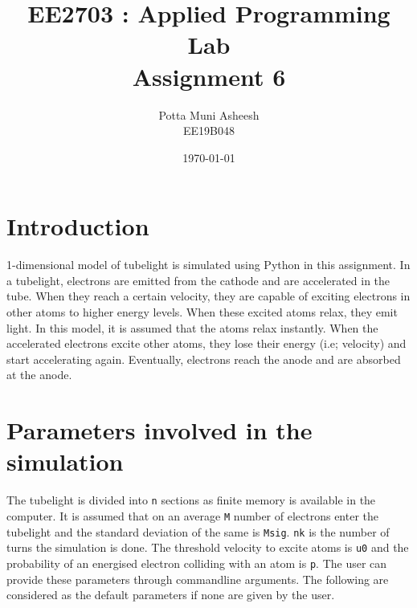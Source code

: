 \documentclass[12pt, a4paper]{article}
\title{\textbf{EE2703 : Applied Programming Lab \\ Assignment 6}} %
\author{Potta Muni Asheesh \\ EE19B048} %
\date{\today} %
\begin{document}
	
		
\maketitle %

\section{Introduction}

1-dimensional model of tubelight is simulated using Python in this assignment. In a tubelight, electrons are emitted from the cathode and are accelerated in the tube. When they reach a certain velocity, they are capable of exciting electrons in other atoms to higher energy levels. When these excited atoms relax, they emit light. In this model, it is assumed that the atoms relax instantly. When the accelerated electrons excite other atoms, they lose their energy (i.e; velocity) and start accelerating again. Eventually, electrons reach the anode and are absorbed at the anode.

\section{Parameters involved in the simulation}

The tubelight is divided into \texttt{n} sections as finite memory is available in the computer. It is assumed that on an average \texttt{M} number of electrons enter the tubelight and the standard deviation of the same is \texttt{Msig}. \texttt{nk} is the number of turns the simulation is done. The threshold velocity to excite atoms is \texttt{u0} and the probability of an energised electron colliding with an atom is \texttt{p}. The user can provide these parameters through commandline arguments. The following are considered as the default parameters if none are given by the user.
\end{document}
